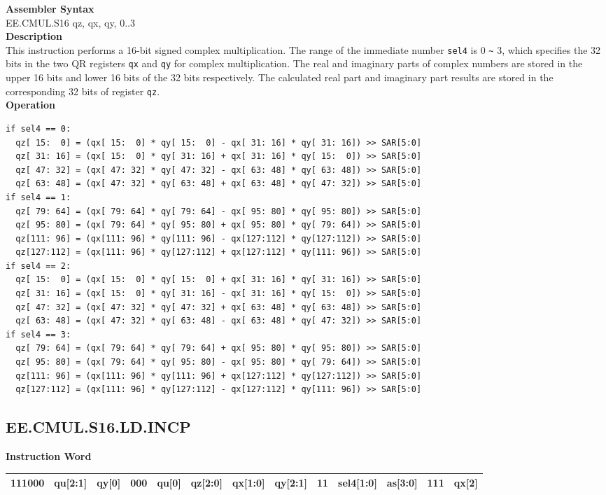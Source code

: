 \textbf{Assembler Syntax} \\
EE.CMUL.S16 qz, qx, qy, 0..3 \\
\textbf{Description} \\
This instruction performs a 16-bit signed complex multiplication. The range of the immediate number \lstinline{sel4} is 0 \verb+~+ 3, which specifies the 32 bits in the two QR registers \lstinline{qx} and \lstinline{qy} for complex multiplication. The real and imaginary parts of complex numbers are stored in the upper 16 bits and lower 16 bits of the 32 bits respectively. The calculated real part and imaginary part results are stored in the corresponding 32 bits of register \lstinline{qz}.\\
\textbf{Operation}
\begin{lstlisting}
if sel4 == 0:
  qz[ 15:  0] = (qx[ 15:  0] * qy[ 15:  0] - qx[ 31: 16] * qy[ 31: 16]) >> SAR[5:0]
  qz[ 31: 16] = (qx[ 15:  0] * qy[ 31: 16] + qx[ 31: 16] * qy[ 15:  0]) >> SAR[5:0]
  qz[ 47: 32] = (qx[ 47: 32] * qy[ 47: 32] - qx[ 63: 48] * qy[ 63: 48]) >> SAR[5:0]
  qz[ 63: 48] = (qx[ 47: 32] * qy[ 63: 48] + qx[ 63: 48] * qy[ 47: 32]) >> SAR[5:0]
if sel4 == 1:
  qz[ 79: 64] = (qx[ 79: 64] * qy[ 79: 64] - qx[ 95: 80] * qy[ 95: 80]) >> SAR[5:0]
  qz[ 95: 80] = (qx[ 79: 64] * qy[ 95: 80] + qx[ 95: 80] * qy[ 79: 64]) >> SAR[5:0]
  qz[111: 96] = (qx[111: 96] * qy[111: 96] - qx[127:112] * qy[127:112]) >> SAR[5:0]
  qz[127:112] = (qx[111: 96] * qy[127:112] + qx[127:112] * qy[111: 96]) >> SAR[5:0]
if sel4 == 2:
  qz[ 15:  0] = (qx[ 15:  0] * qy[ 15:  0] + qx[ 31: 16] * qy[ 31: 16]) >> SAR[5:0]
  qz[ 31: 16] = (qx[ 15:  0] * qy[ 31: 16] - qx[ 31: 16] * qy[ 15:  0]) >> SAR[5:0]
  qz[ 47: 32] = (qx[ 47: 32] * qy[ 47: 32] + qx[ 63: 48] * qy[ 63: 48]) >> SAR[5:0]
  qz[ 63: 48] = (qx[ 47: 32] * qy[ 63: 48] - qx[ 63: 48] * qy[ 47: 32]) >> SAR[5:0]
if sel4 == 3:
  qz[ 79: 64] = (qx[ 79: 64] * qy[ 79: 64] + qx[ 95: 80] * qy[ 95: 80]) >> SAR[5:0]
  qz[ 95: 80] = (qx[ 79: 64] * qy[ 95: 80] - qx[ 95: 80] * qy[ 79: 64]) >> SAR[5:0]
  qz[111: 96] = (qx[111: 96] * qy[111: 96] + qx[127:112] * qy[127:112]) >> SAR[5:0]
  qz[127:112] = (qx[111: 96] * qy[127:112] - qx[127:112] * qy[111: 96]) >> SAR[5:0]
\end{lstlisting}

\clearpage
\subsection{EE.CMUL.S16.LD.INCP}\label{instruction:EECMULS16LDINCP}
\setlength\tabcolsep{6pt}
\textbf{Instruction Word} \\
\begin{tabular}{|c|c|c|c|c|c|c|c|c|c|c|c|c|}
	\hline
	111000 & qu[2:1] & qy[0] & 000 & qu[0] & qz[2:0] & qx[1:0] & qy[2:1] & 11 & sel4[1:0] & as[3:0] & 111 & qx[2] \\
	\hline
\end{tabular}

